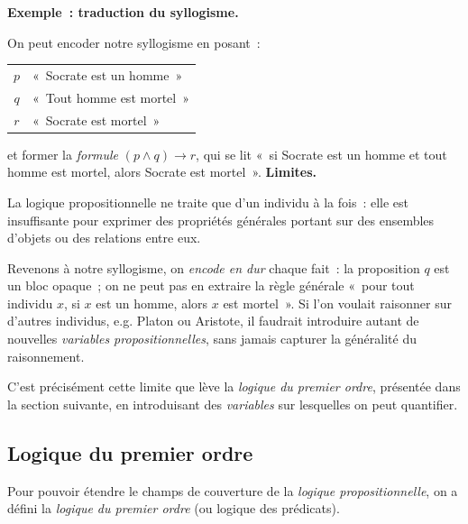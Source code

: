 \documentclass[11pt]{article}
\newenvironment{paraph}[1]{%
  \medskip
  \noindent\textbf{#1.}\quad

  \vspace{0.2cm}
}{%
  \medskip
}
\begin{document}
\begin{paraph}{Exemple~: traduction du syllogisme}
On peut encoder notre syllogisme en posant~:
\begin{center}
\begin{tabular}{cl}
    $p$ & «~Socrate est un homme~» \\
    $q$ & «~Tout homme est mortel~» \\
    $r$ & «~Socrate est mortel~»
\end{tabular}
\end{center}
et former la \textit{formule} $(p \wedge q) \rightarrow r$, qui se lit
«~si Socrate est un homme et tout homme est mortel, alors Socrate est mortel~».
\end{paraph}
\newpage
\begin{paraph}{Limites}
La logique propositionnelle ne traite que d'un individu à la 
fois~: elle est insuffisante pour exprimer des propriétés générales 
portant sur des ensembles d'objets ou des relations entre eux.
\end{paraph}

\vspace{0.2cm}
Revenons à notre syllogisme, on \emph{encode en dur} chaque 
fait~: la proposition $q$ est un bloc opaque~; 
on ne peut pas en extraire la règle générale 
«~pour tout individu $x$, si $x$ est un homme, 
alors $x$ est mortel~». Si l'on voulait raisonner sur d'autres 
individus, e.g. Platon ou Aristote, il faudrait introduire 
autant de nouvelles \textit{variables propositionnelles}, 
sans jamais capturer la généralité du raisonnement.

\vspace{0.2cm}
C'est précisément cette limite que lève la 
\textit{logique du premier ordre}, présentée dans 
la section suivante, en introduisant des \textit{variables} 
sur lesquelles on peut quantifier.

\subsection{Logique du premier ordre}

\vspace{0.2cm}
Pour pouvoir étendre le champs de couverture de la 
\textit{logique propositionnelle}, on a défini la 
\textit{logique du premier ordre} (ou logique des prédicats).
\end{document}
